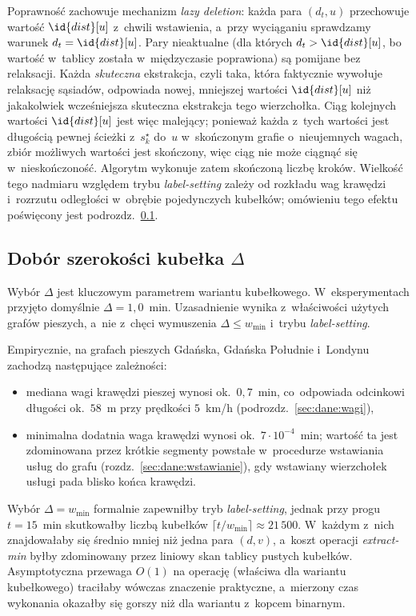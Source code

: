 \clearpage

Poprawność zachowuje mechanizm \emph{lazy deletion}: każda para $(d_t,u)$
przechowuje wartość $\id{dist}[u]$ z~chwili wstawienia, a~przy wyciąganiu
sprawdzamy warunek $d_t=\id{dist}[u]$. Pary nieaktualne (dla których
$d_t>\id{dist}[u]$, bo wartość w~tablicy została w~międzyczasie poprawiona)
są pomijane bez relaksacji. Każda \emph{skuteczna} ekstrakcja, czyli taka,
która faktycznie wywołuje relaksację sąsiadów, odpowiada nowej, mniejszej
wartości $\id{dist}[u]$ niż jakakolwiek wcześniejsza skuteczna ekstrakcja
tego wierzchołka. Ciąg kolejnych wartości $\id{dist}[u]$ jest więc
malejący; ponieważ każda z~tych wartości jest długością pewnej ścieżki
z~$s^\star_k$ do~$u$ w~skończonym grafie o~nieujemnych wagach, zbiór możliwych
wartości jest skończony, więc ciąg nie może ciągnąć się w~nieskończoność.
Algorytm wykonuje zatem skończoną liczbę kroków. Wielkość tego nadmiaru
względem trybu \emph{label-setting} zależy od rozkładu wag krawędzi i~rozrzutu
odległości w~obrębie pojedynczych kubełków; omówieniu tego efektu poświęcony
jest podrozdz.~\ref{subsec:warianty:bucket:delta}.

\subsection{Dobór szerokości kubełka $\Delta$}
\label{subsec:warianty:bucket:delta}

Wybór $\Delta$ jest kluczowym parametrem wariantu kubełkowego.
W~eksperymentach przyjęto domyślnie $\Delta=1{,}0$~min.
Uzasadnienie wynika z~właściwości użytych grafów pieszych, a~nie z~chęci
wymuszenia $\Delta\le w_{\min}$ i~trybu \emph{label-setting}.

Empirycznie, na grafach pieszych Gdańska, Gdańska Południe i~Londynu
zachodzą następujące zależności:
\begin{itemize}
  \item mediana wagi krawędzi pieszej wynosi ok.\ $0{,}7$~min,
        co~odpowiada odcinkowi długości ok.\ $58$~m przy prędkości
        $5$~km/h (podrozdz.~\ref{sec:dane:wagi}),
  \item minimalna dodatnia waga krawędzi wynosi ok.\ $7\cdot 10^{-4}$~min;
        wartość ta jest zdominowana przez krótkie segmenty powstałe
        w~procedurze wstawiania usług do grafu (rozdz.~\ref{sec:dane:wstawianie}),
        gdy wstawiany wierzchołek usługi pada blisko końca krawędzi.
\end{itemize}

Wybór $\Delta=w_{\min}$ formalnie zapewniłby tryb \emph{label-setting}, jednak
przy progu $t=15$~min skutkowałby liczbą kubełków
$\lceil t/w_{\min}\rceil\approx 21\,500$. W~każdym z~nich znajdowałaby się
średnio mniej niż jedna para $(d,v)$, a~koszt operacji \emph{extract-min} byłby
zdominowany przez liniowy skan tablicy pustych kubełków. Asymptotyczna
przewaga $O(1)$ na operację (właściwa dla wariantu kubełkowego) traciłaby
wówczas znaczenie praktyczne, a~mierzony czas wykonania okazałby się
gorszy niż dla wariantu z~kopcem binarnym.

